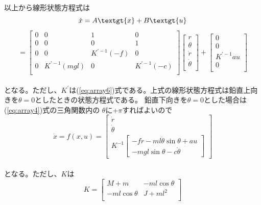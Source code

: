 	\\
	以上から線形状態方程式は\\
	\[\dot{x}=A\textgt{x}+B\textgt{u}\]
	\begin{equation}
		=\left[
		\begin{array}{cccc}
			0 & 0 & 1 & 0 \\
			0 & 0 & 0 & 1 \\
			0 & 0 & K^{'-1}(-f) & 0 \\
			0 & K^{'-1}(mgl) & 0 & K^{'-1}(-c)\\
		\end{array}
		\right]
		\left[
		\begin{array}{c}
			r\\
			\theta\\
			\dot{r}\\
			\dot{\theta}\\
		\end{array}
		\right] + 
		\left[
		\begin{array}{c}
			0\\
			0\\
			K^{'-1}au\\
			0\\
		\end{array}
		\right]
		\label{eq:InPeAboveLiner}
	\end{equation}
	\\
	となる。ただし、$K^{'}$は(\ref{eq:array6})式である。上式の線形状態方程式は鉛直上向きを$\theta = 0$としたときの状態方程式である。
	鉛直下向きを$\theta = 0$とした場合は(\ref{eq:array4})式の三角関数内の
	$\theta$に+$\pi$すればよいので
	\begin{equation}
		\dot{x} = f(x,u)=\left[
		\begin{array}{ccc}
			\dot{r}\\
			\dot{\theta}\\
			K^{-1}\left[
			\begin{array}{ccc}
				-f\dot{r}-ml\ddot{\theta}\sin{\theta}+au\\
				-mgl\sin{\theta}-c\dot{\theta}
			\end{array}
			\right]
		\end{array}
		\right]
		\label{eq:InPeUnderNonLiner}
	\end{equation}
	\\
	となる。ただし、$K$は
	\begin{equation}
		K=\left[
		\begin{array}{ccc}
			M+m & -ml\cos{\theta}\\
			-ml\cos{\theta} & J+ml^{2}\\
		\end{array}
		\right]
		\label{eq:InPeUnderNonLinerK}
	\end{equation}
